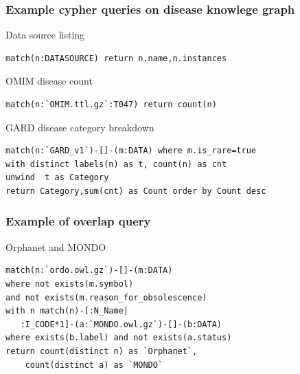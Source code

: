 ﻿\documentclass[anchorcolor=blue,linkcolor=blue]{beamer}
\begin{document}
\begin{frame}[fragile]
  \frametitle{Example cypher queries on disease knowlege graph}
  \begin{block}{Data source listing}
    \small
\begin{verbatim}
match(n:DATASOURCE) return n.name,n.instances
\end{verbatim}
  \end{block}

  \begin{block}{OMIM disease count}
    \small
\begin{verbatim}
match(n:`OMIM.ttl.gz`:T047) return count(n)
\end{verbatim}
  \end{block}
  
  \begin{block}{GARD disease category breakdown}
    \small
\begin{verbatim}
match(n:`GARD_v1`)-[]-(m:DATA) where m.is_rare=true 
with distinct labels(n) as t, count(n) as cnt 
unwind  t as Category
return Category,sum(cnt) as Count order by Count desc
\end{verbatim}
  \end{block}
\end{frame}

\begin{frame}[fragile]
  \frametitle{Example of overlap query}
  \begin{block}{Orphanet and MONDO}
    \small
\begin{verbatim}
match(n:`ordo.owl.gz`)-[]-(m:DATA) 
where not exists(m.symbol) 
and not exists(m.reason_for_obsolescence) 
with n match(n)-[:N_Name|
   :I_CODE*1]-(a:`MONDO.owl.gz`)-[]-(b:DATA) 
where exists(b.label) and not exists(a.status) 
return count(distinct n) as `Orphanet`,
    count(distinct a) as `MONDO`
\end{verbatim}
  \end{block}
\end{frame}
\end{document}
